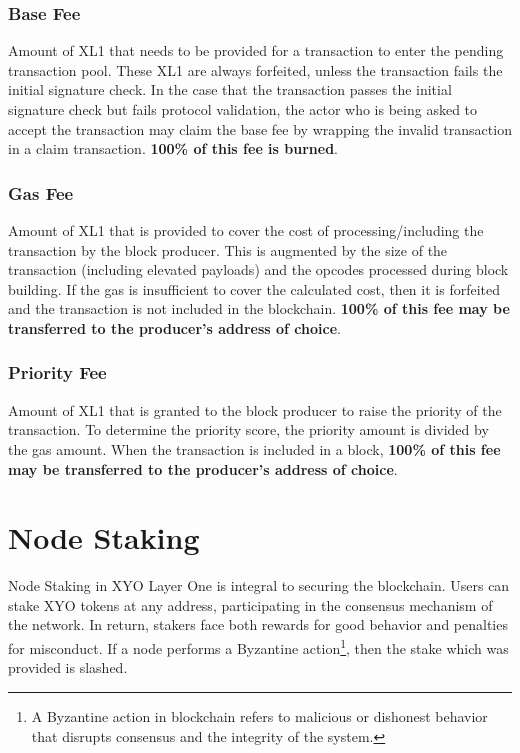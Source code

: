 \documentclass{article}
\begin{document}
\subsubsection{Base Fee}
Amount of XL1 that needs to be provided for a transaction to enter the pending
transaction pool. These XL1 are always forfeited, unless the transaction fails
the initial signature check. In the case that the transaction passes the
initial signature check but fails protocol validation, the actor who is being
asked to accept the transaction may claim the base fee by wrapping the invalid
transaction in a claim transaction. \textbf{100\% of this fee is burned}.

\subsubsection{Gas Fee}
Amount of XL1 that is provided to cover the cost of processing/including the
transaction by the block producer. This is augmented by the size of the
transaction (including elevated payloads) and the opcodes processed during
block building. If the gas is insufficient to cover the calculated cost, then
it is forfeited and the transaction is not included in the blockchain.
\textbf{100\% of this fee may be transferred to the producer’s address of
    choice}.

\subsubsection{Priority Fee}
Amount of XL1 that is granted to the block producer to raise the priority of
the transaction. To determine the priority score, the priority amount is
divided by the gas amount. When the transaction is included in a block,
\textbf{100\% of this fee may be transferred to the producer's address of
    choice}.

\section{Node Staking}
Node Staking in XYO Layer One is integral to securing the blockchain. Users can
stake XYO tokens at any address, participating in the consensus mechanism of
the network. In return, stakers face both rewards for good behavior and
penalties for misconduct. If a node performs a Byzantine action\footnote{A
    Byzantine action in blockchain refers to malicious or dishonest behavior that
    disrupts consensus and the integrity of the system.}, then the stake which was
provided is slashed.
\end{document}
